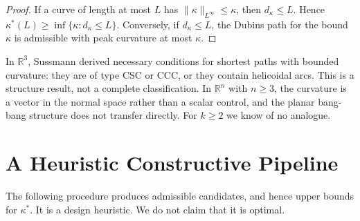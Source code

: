 \documentclass[11pt,reqno]{amsart}
\theoremstyle{definition}
\providecommand{\R}{\mathbb{R}}
\numberwithin{equation}{section}
\providecommand{\R}{\mathbb{R}}
\begin{document}
\begin{proof}
If a curve of length at most $L$ has $\|\kappa\|_{L^\infty} \le \kappa$, then $d_\kappa \le L$. Hence $\kappa^*(L) \ge \inf\{\kappa : d_\kappa \le L\}$. Conversely, if $d_\kappa \le L$, the Dubins path for the bound $\kappa$ is admissible with peak curvature at most $\kappa$.
\end{proof}

In $\R^3$, Sussmann \cite{sussmann1995} derived necessary conditions for shortest paths with bounded curvature: they are of type CSC or CCC, or they contain helicoidal arcs. This is a structure result, not a complete classification. In $\R^n$ with $n \ge 3$, the curvature is a vector in the normal space rather than a scalar control, and the planar bang-bang structure does not transfer directly. For $k \ge 2$ we know of no analogue.

\section{A Heuristic Constructive Pipeline}
\label{sec:pipeline}

The following procedure produces admissible candidates, and hence upper bounds for $\kappa^*$. It is a design heuristic. We do not claim that it is optimal.
\end{document}
